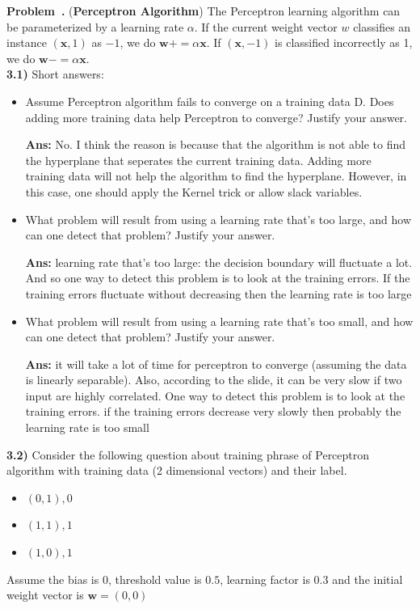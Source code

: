 \documentclass{article}
\newcounter{problem}[section]
\newenvironment{problem}[1][]{\refstepcounter{problem}\par\medskip
   \noindent \textbf{Problem~\theproblem. #1} \rmfamily}{\medskip}
\newenvironment{proof}{\begin{mdframed}\textbf{Ans:}}{ \end{mdframed}}
\begin{document}
\begin{problem}(\textbf{Perceptron Algorithm})
The Perceptron learning algorithm can be parameterized by a learning rate
$\alpha$. If the current weight vector $w$ classifies an instance $(\mathbf{x}, 1)$ as $-1$, we do $\mathbf{w} += \alpha \mathbf{x}$. If $(\mathbf{x}, -1)$ is
classified incorrectly as 1, we do $\mathbf{w} -= \alpha\mathbf{x}$.
\\
\textbf{3.1)} Short answers:
\begin{itemize}
    \item Assume Perceptron algorithm fails to converge on a training data D. Does adding more training data help Perceptron to converge? Justify your answer.
    \begin{proof}
        No. I think the reason is because that the algorithm is not able to find the hyperplane that seperates the current training data. Adding more training data will not help the algorithm to find the hyperplane. However, in this case, one should apply the Kernel trick or allow slack variables.
    \end{proof}
    \item What problem will result from using a learning rate that's too large, and how can one detect that problem? Justify your answer.
    \begin{proof}
        learning rate that’s too large: the decision boundary will fluctuate a lot. And so one way to detect this problem is to look at the training errors. If the training errors fluctuate without decreasing then the learning rate is too large
    \end{proof}
    \item What problem will result from using a learning rate that's too small, and how can one detect that problem? Justify your answer.
    \begin{proof}
        it will take a lot of time for perceptron to converge (assuming the data is linearly separable). 
        Also,  according to the slide, it can be very slow if two input are highly correlated.
        One way to detect this problem is to look at the training errors. if the training errors decrease very slowly then probably the learning rate is too small
    \end{proof}
\end{itemize}
\textbf{3.2)} Consider the following question about training phrase of Perceptron algorithm with training data (2
dimensional vectors) and their label.
\begin{itemize}
    \item $(0,1),0$
    \item $(1,1),1$
    \item $(1,0),1$
\end{itemize}
Assume the bias is $0$, threshold value is $0.5$, learning factor is $0.3$ and the initial weight vector is $\mathbf{w}=(0,0)$
\end{problem}
\end{document}
